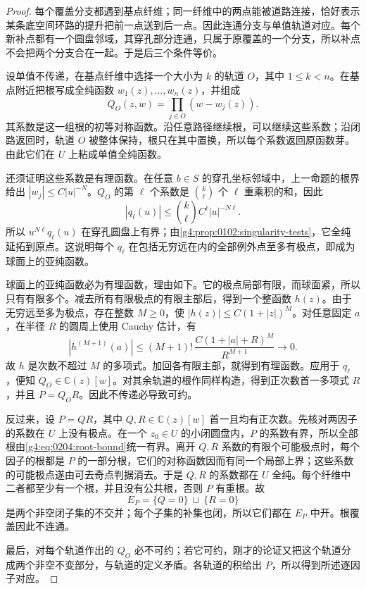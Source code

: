 \begin{proof}
	每个覆盖分支都遇到基点纤维；同一纤维中的两点能被道路连接，恰好表示某条底空间环路的提升把前一点送到后一点。因此连通分支与单值轨道对应。每个新补点都有一个圆盘邻域，其穿孔部分连通，只属于原覆盖的一个分支，所以补点不会把两个分支合在一起。于是后三个条件等价。

	设单值不传递，在基点纤维中选择一个大小为 \(k\) 的轨道 \(O\)，其中 \(1\le k<n\)。在基点附近把根写成全纯函数 \(w_1(z),\ldots,w_n(z)\)，并组成
	\[
		Q_O(z,w)=\prod_{j\in O}(w-w_j(z)).
	\]
	其系数是这一组根的初等对称函数。沿任意路径继续根，可以继续这些系数；沿闭路返回时，轨道 \(O\) 被整体保持，根只在其中置换，所以每个系数返回原函数芽。由此它们在 \(U\) 上粘成单值全纯函数。

	还须证明这些系数是有理函数。在任意 \(b\in S\) 的穿孔坐标邻域中，上一命题的根界给出 \(|w_j|\le C|u|^{-N}\)。\(Q_O\) 的第 \(\ell\) 个系数是 \(\binom{k}{\ell}\) 个 \(\ell\) 重乘积的和，因此
	\[
		|q_\ell(u)|\le\binom{k}{\ell}C^\ell|u|^{-N\ell}.
	\]
	所以 \(u^{N\ell}q_\ell(u)\) 在穿孔圆盘上有界；由\cref{g4:prop:0102:singularity-tests}，它全纯延拓到原点。这说明每个 \(q_\ell\) 在包括无穷远在内的全部例外点至多有极点，即成为球面上的亚纯函数。

	球面上的亚纯函数必为有理函数，理由如下。它的极点局部有限，而球面紧，所以只有有限多个。减去所有有限极点的有限主部后，得到一个整函数 \(h(z)\)。由于无穷远至多为极点，存在整数 \(M\ge0\)，使 \(|h(z)|\le C(1+|z|)^M\)。对任意固定 \(a\)，在半径 \(R\) 的圆周上使用 Cauchy 估计，有
	\[
		|h^{(M+1)}(a)|
		\le (M+1)!\,\frac{C(1+|a|+R)^M}{R^{M+1}}
		\longrightarrow0.
	\]
	故 \(h\) 是次数不超过 \(M\) 的多项式。加回各有限主部，就得到有理函数。应用于 \(q_\ell\)，便知 \(Q_O\in\mathbb C(z)[w]\)。对其余轨道的根作同样构造，得到正次数首一多项式 \(R\)，并且 \(P=Q_OR\)。因此不传递必导致可约。

	反过来，设 \(P=QR\)，其中 \(Q,R\in\mathbb C(z)[w]\) 首一且均有正次数。先核对两因子的系数在 \(U\) 上没有极点。在一个 \(z_0\in U\) 的小闭圆盘内，\(P\) 的系数有界，所以全部根由\eqref{g4:eq:0204:root-bound}统一有界。离开 \(Q,R\) 系数的有限个可能极点时，每个因子的根都是 \(P\) 的一部分根，它们的对称函数因而有同一个局部上界；这些系数的可能极点遂由可去奇点判据消去。于是 \(Q,R\) 的系数都在 \(U\) 全纯。每个纤维中二者都至少有一个根，并且没有公共根，否则 \(P\) 有重根。故
	\[
		E_P=\{Q=0\}\ \sqcup\ \{R=0\}
	\]
	是两个非空闭子集的不交并；每个子集的补集也闭，所以它们都在 \(E_P\) 中开。根覆盖因此不连通。

	最后，对每个轨道作出的 \(Q_O\) 必不可约；若它可约，刚才的论证又把这个轨道分成两个非空不变部分，与轨道的定义矛盾。各轨道的积给出 \(P\)，所以得到所述逐因子对应。
\end{proof}

